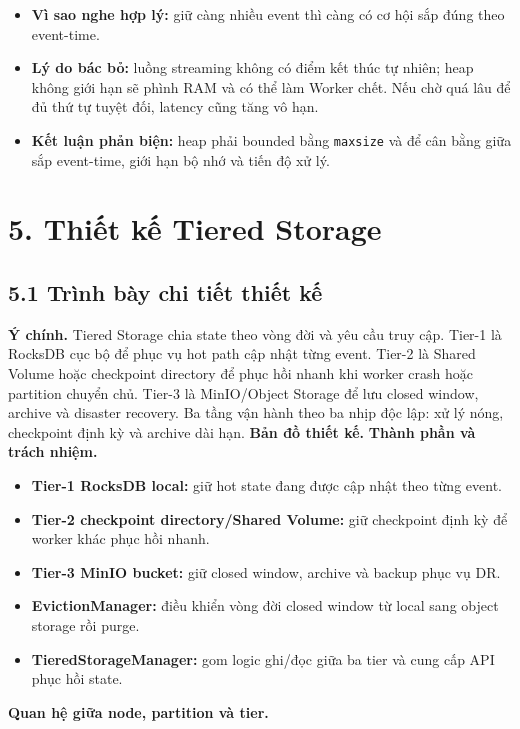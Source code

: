\documentclass[12pt,a4paper]{article}
\begin{document}
\begin{itemize}
\item \textbf{Vì sao nghe hợp lý:} giữ càng nhiều event thì càng có cơ hội sắp đúng theo event-time.
\item \textbf{Lý do bác bỏ:} luồng streaming không có điểm kết thúc tự nhiên; heap không giới hạn sẽ phình RAM và có thể làm Worker chết. Nếu chờ quá lâu để đủ thứ tự tuyệt đối, latency cũng tăng vô hạn.
\item \textbf{Kết luận phản biện:} heap phải bounded bằng \texttt{maxsize} và  để cân bằng giữa sắp event-time, giới hạn bộ nhớ và tiến độ xử lý.
\end{itemize}

\section{5. Thiết kế Tiered Storage}
\label{sec:tiered-storage}

\subsection{5.1 Trình bày chi tiết thiết kế}
\textbf{Ý chính.} Tiered Storage chia state theo vòng đời và yêu cầu truy cập. Tier-1 là RocksDB cục bộ để phục vụ hot path cập nhật từng event. Tier-2 là Shared Volume hoặc checkpoint directory để phục hồi nhanh khi worker crash hoặc partition chuyển chủ. Tier-3 là MinIO/Object Storage để lưu closed window, archive và disaster recovery. Ba tầng vận hành theo ba nhịp độc lập: xử lý nóng, checkpoint định kỳ và archive dài hạn.
\textbf{Bản đồ thiết kế.}
\textbf{Thành phần và trách nhiệm.}

\begin{itemize}
\item \textbf{Tier-1 RocksDB local:} giữ hot state đang được cập nhật theo từng event.
\item \textbf{Tier-2 checkpoint directory/Shared Volume:} giữ checkpoint định kỳ để worker khác phục hồi nhanh.
\item \textbf{Tier-3 MinIO bucket:} giữ closed window, archive và backup phục vụ DR.
\item \textbf{EvictionManager:} điều khiển vòng đời closed window từ local sang object storage rồi purge.
\item \textbf{TieredStorageManager:} gom logic ghi/đọc giữa ba tier và cung cấp API phục hồi state.
\end{itemize}
\textbf{Quan hệ giữa node, partition và tier.}
\end{document}

